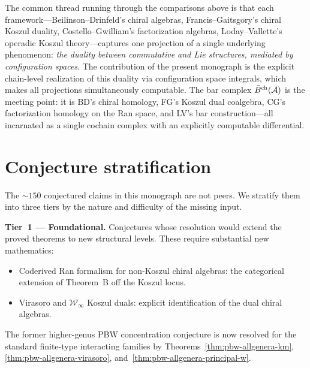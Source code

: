 \begin{remark}[Synthesis]\label{rem:concordance-synthesis}
The common thread running through the comparisons above is that each
framework---Beilinson--Drinfeld's chiral algebras, Francis--Gaitsgory's
chiral Koszul duality, Costello--Gwilliam's factorization algebras,
Loday--Vallette's operadic Koszul theory---captures one projection of a
single underlying phenomenon: \emph{the duality between commutative and
Lie structures, mediated by configuration spaces}.  The contribution of
the present monograph is the explicit chain-level realization of this
duality via configuration space integrals, which makes all projections
simultaneously computable.  The bar complex $\bar{B}^{\mathrm{ch}}(\mathcal{A})$
is the meeting point: it is BD's chiral homology, FG's Koszul dual
coalgebra, CG's factorization homology on the Ran space, and LV's bar
construction---all incarnated as a single cochain complex with an
explicitly computable differential.
\end{remark}

\section{Conjecture stratification}
\label{sec:conjecture-stratification}

The ${\sim}150$ conjectured claims in this monograph are not peers.
We stratify them into three tiers by the nature and difficulty of
the missing input.

\smallskip\noindent\textbf{Tier~1 --- Foundational.}
Conjectures whose resolution would extend the proved theorems
to new structural levels.  These require substantial new
mathematics:
\begin{itemize}
\item Coderived Ran formalism for non-Koszul chiral algebras:
  the categorical extension of Theorem~B off the Koszul locus.
\item Virasoro and $\mathcal{W}_{\infty}$ Koszul duals: explicit
  identification of the dual chiral algebras.
\end{itemize}

\smallskip
\noindent
The former higher-genus PBW concentration conjecture is now resolved
for the standard finite-type interacting families by
Theorems~\ref{thm:pbw-allgenera-km},
\ref{thm:pbw-allgenera-virasoro},
and~\ref{thm:pbw-allgenera-principal-w}.

